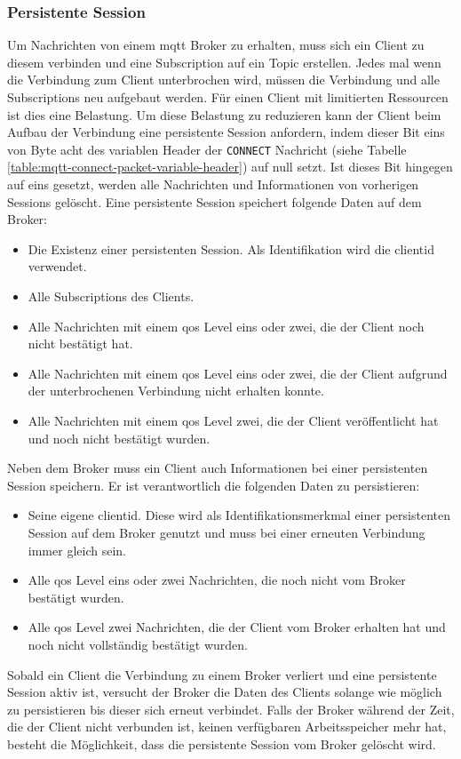 \subsubsection{Persistente Session} \label{s:persistent-session}
Um Nachrichten von einem \ac{mqtt} Broker zu erhalten, muss sich ein Client zu diesem verbinden und eine Subscription auf ein Topic erstellen.
Jedes mal wenn die Verbindung zum Client unterbrochen wird, müssen die Verbindung und alle Subscriptions neu aufgebaut werden.
Für einen Client mit limitierten Ressourcen ist dies eine Belastung.
Um diese Belastung zu reduzieren kann der Client beim Aufbau der Verbindung eine persistente Session anfordern, indem dieser Bit eins von Byte acht des variablen Header der \verb|CONNECT| Nachricht (siehe Tabelle \ref{table:mqtt-connect-packet-variable-header}) auf null setzt.
Ist dieses Bit hingegen auf eins gesetzt, werden alle Nachrichten und Informationen von vorherigen Sessions gelöscht.
Eine persistente Session speichert folgende Daten auf dem Broker:
\begin{itemize}
    \item Die Existenz einer persistenten Session. Als Identifikation wird die \acs{clientid} verwendet.
    \item Alle Subscriptions des Clients.
    \item Alle Nachrichten mit einem \ac{qos} Level eins oder zwei, die der Client noch nicht bestätigt hat.
    \item Alle Nachrichten mit einem \ac{qos} Level eins oder zwei, die der Client aufgrund der unterbrochenen Verbindung nicht erhalten konnte.
    \item Alle Nachrichten mit einem \ac{qos} Level zwei, die der Client veröffentlicht hat und noch nicht bestätigt wurden.
\end{itemize}
Neben dem Broker muss ein Client auch Informationen bei einer persistenten Session speichern. Er ist verantwortlich die folgenden Daten zu persistieren:
\begin{itemize}
    \item Seine eigene \ac{clientid}. Diese wird als Identifikationsmerkmal einer persistenten Session auf dem Broker genutzt und muss bei einer erneuten Verbindung immer gleich sein.
    \item Alle \ac{qos} Level eins oder zwei Nachrichten, die noch nicht vom Broker bestätigt wurden.
    \item Alle \ac{qos} Level zwei Nachrichten, die der Client vom Broker erhalten hat und noch nicht vollständig bestätigt wurden.
\end{itemize}
Sobald ein Client die Verbindung zu einem Broker verliert und eine persistente Session aktiv ist, versucht der Broker die Daten des Clients solange wie möglich zu persistieren bis dieser sich erneut verbindet. Falls der Broker während der Zeit, die der Client nicht verbunden ist, keinen verfügbaren Arbeitsspeicher mehr hat, besteht die Möglichkeit, dass die persistente Session vom Broker gelöscht wird.
\cite{teamPersistentSessionQueuing}

